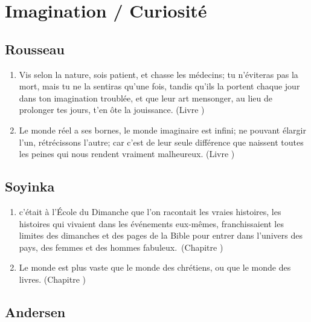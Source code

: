 \documentclass[a4paper, 11pt, hidelinks]{article}
\newcommand{\rb}[1]{\Romanbar{#1}}
\begin{document}
\section{Imagination / Curiosité}



\subsection{Rousseau}


\begin{enumerate}
    \item Vis selon la nature, sois patient, et chasse les médecins; tu n'éviteras pas la mort, mais tu ne la sentiras qu'une fois, tandis qu'ils la portent chaque jour dans ton imagination troublée, et que leur art mensonger, au lieu de prolonger tes jours, t'en ôte la jouissance. (Livre \rb{2})
    \item Le monde réel a ses bornes, le monde imaginaire est infini; ne pouvant élargir l'un, rétrécissons l'autre; car c'est de leur seule différence que naissent toutes les peines qui nous rendent vraiment malheureux. (Livre \rb{2})
\end{enumerate}



\subsection{Soyinka}


\begin{enumerate}
    \item c'était à l'École du Dimanche que l'on racontait les vraies histoires, les histoires qui vivaient dans les événements eux-mêmes, franchissaient les limites des dimanches et des pages de la Bible pour entrer dans l'univers des pays, des femmes et des hommes fabuleux. (Chapitre \rb{1})
    \item Le monde est plus vaste que le monde des chrétiens, ou que le monde des livres. (Chapitre \rb{9})
\end{enumerate}




\subsection{Andersen}
\end{document}
